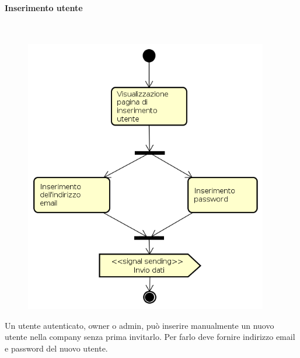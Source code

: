 \paragraph{Inserimento utente} \mbox{} \\
\begin{figure}[H]
\begin{center}
\includegraphics[height=12cm]{res/sections/backend/activities/inserimentoUtente.png}
\end{center}
\end{figure}
Un utente autenticato, owner o admin, può inserire manualmente un nuovo utente nella company senza prima invitarlo. Per farlo deve fornire indirizzo email e password del nuovo utente.
